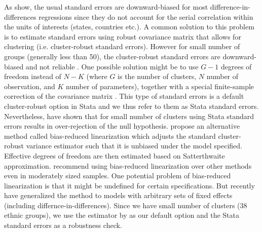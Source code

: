As \citet{bertrand_how_2004} show, the usual standard errors  are downward-biased for most difference-in-differences regressions since they do not account for the serial correlation within the units of interests (states, countries etc.). A common solution to this problem is to estimate standard errors using robust covariance matrix that allows for clustering (i.e. cluster-robust standard errors). However for small number of groups (generally less than 50), the cluster-robust standard errors are downward-biased and not reliable \citep[chapter 8]{donald_inference_2007, angrist_mostly_2009}.
One possible solution might be to use $G - 1$ degrees of freedom   instead of $N - K$ (where $G$ is the number of clusters, $N$ number of observation, and $K$ number of parameters),
together with a special finite-sample correction of the covariance matrix \citep{angrist_mostly_2009, cameron_practitioners_2015, imbens_robust_2016}.
 This type of standard errors is a default cluster-robust option in Stata and we thus refer to them as Stata  standard errors. Nevertheless, \citet{imbens_robust_2016} have shown  that for small number of clusters using Stata standard errors  results in over-rejection of the null hypothesis. 
\citet{mccaffrey_bias_2002} propose an alternative method called bias-reduced linearization which  adjusts the standard cluster-robust variance estimator such that it is unbiased under the model specified. 
Effective degrees of freedom are then estimated based on  Satterthwaite approximation. 
\citet{imbens_robust_2016} recommend using  bias-reduced linearization over other methods even in  moderately sized samples. One potential problem of bias-reduced linearization is that it might be undefined for certain specifications. But recently  \citet{pustejovsky_small-sample_2018} have generalized the method to models with arbitrary sets of fixed effects (including differnce-in-differences). 
Since we have small number of clusters (38 ethnic groups), we use the  estimator by \citet{pustejovsky_small-sample_2018}  as our default option and the Stata  standard errors as a robustness check. 



